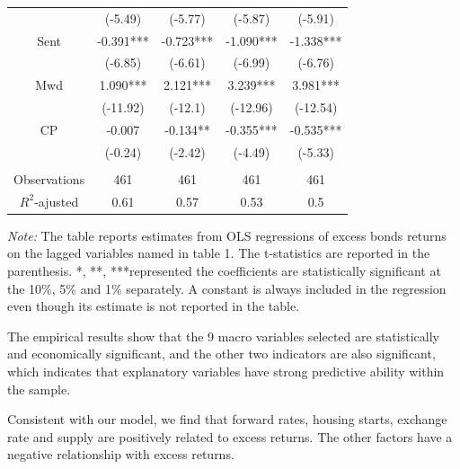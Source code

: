 \documentclass[12pt]{article}
\begin{document}
\begin{table}[htp!]
{\begin{threeparttable}
\begin{tabular}{ccccc}
             & (-5.49)     & (-5.77)     & (-5.87)     & (-5.91)  \\
    Sent     & -0.391***   & -0.723***   & -1.090***   & -1.338***\\
             & (-6.85)     & (-6.61)     & (-6.99)     & (-6.76)  \\
    Mwd      & 1.090***    & 2.121***    & 3.239***    & 3.981*** \\
             & (-11.92)    & (-12.1)     & (-12.96)    & (-12.54) \\
    CP       & -0.007      & -0.134**    & -0.355***   & -0.535***\\
             & (-0.24)     & (-2.42)     & (-4.49)     & (-5.33)  \\
             &             &             &             &          \\
    Observations & 461     & 461         & 461         & 461      \\
    $R^2$-ajusted   & 0.61   & 0.57        & 0.53        & 0.5      \\
        \bottomrule
    \end{tabular}
    \begin{tablenotes} 
    \footnotesize
    \item \textit{Note:} The table reports estimates from OLS regressions of excess bonds returns on the lagged variables named in table 1. The t-statistics are reported in the parenthesis. *, **, ***represented the coefficients are statistically significant at the 10\%, 5\% and 1\% separately. A constant is always included in the regression even though its estimate is not reported in the table.
    \end{tablenotes} 
    \end{threeparttable} 
    }
\end{table}

\newpage

The empirical results show that the 9 macro variables selected are statistically and economically significant, and the other two indicators are also significant, which indicates that explanatory variables have strong predictive ability within the sample.

Consistent with our model, we find that forward rates, housing starts, exchange rate and supply are positively related to excess returns. The other factors have a negative relationship with excess returns.
\end{document}

